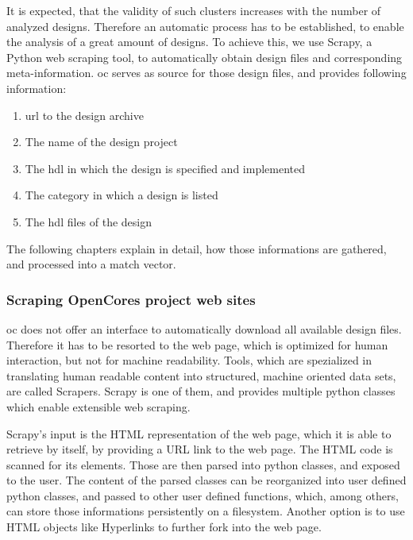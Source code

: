 It is expected, that the validity of such clusters increases with the number of analyzed designs. Therefore an automatic process has to be established, to enable the analysis of a great amount of designs. To achieve this, we use Scrapy, a Python web scraping tool, to automatically obtain design files and corresponding meta-information. \gls{oc} serves as source for those design files, and provides following information: 

\begin{enumerate}

	\item{\gls{url} to the design archive}

	\item{The name of the design project}

	\item{The \gls{hdl} in which the design is specified and implemented}

	\item{The category in which a design is listed}
	
	\item{The \gls{hdl} files of the design}
	
\end{enumerate}
The following chapters explain in detail, how those informations are gathered, and processed into a match vector. 

\subsubsection{Scraping OpenCores project web sites} 
\gls{oc} does not offer an interface to automatically download all available design files. Therefore it has to be resorted to the web page, which is optimized for human interaction, but not for machine readability. Tools, which are spezialized in translating human readable content into structured, machine oriented data sets, are called Scrapers. Scrapy is one of them, and provides multiple python classes which enable extensible web scraping. 

Scrapy's input is the HTML representation of the web page, which it is able to retrieve by itself, by providing a URL link to the web page. The HTML code is scanned for its elements.  Those are then parsed into python classes, and exposed to the user. The content of the parsed classes can be reorganized into user defined python classes, and passed to other user defined functions, which, among others, can store those informations persistently on a filesystem. Another option is to use HTML objects like Hyperlinks to further fork into the web page.

